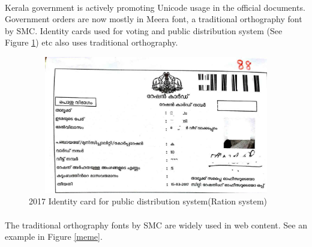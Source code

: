 \documentclass[10pt]{article}
\begin{document}
\paragraph{}
Kerala government is actively promoting Unicode usage in the official documents. Government orders are now mostly in Meera font, a traditional orthography font by SMC. Identity cards used for voting and public distribution system (See Figure \ref{rationcard}) etc also uses traditional orthography.

\begin{figure}[h!]
 \centering
  \includegraphics[width=1.0\textwidth,height=6cm ]{images/2017-rationcard.jpg}
   \caption{2017 Identity card for public distribution system(Ration system)}
  \label{rationcard}
\end{figure}
\paragraph{}
The traditional orthography fonts by SMC are widely used in web content. See an example in Figure \ref{meme}. 
\end{document}
